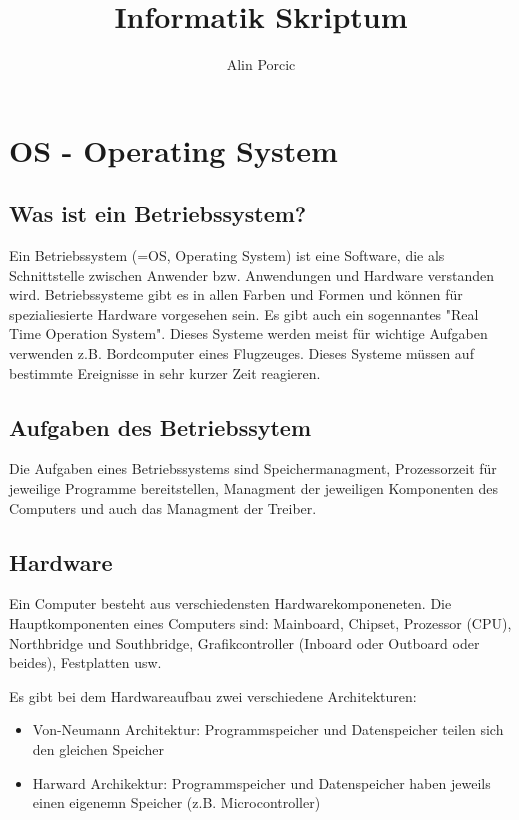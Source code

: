 \documentclass[a4paper]{report}
\title{Informatik Skriptum}
\author{Alin Porcic}
\begin{document}
\maketitle
\tableofcontents

\chapter{OS - Operating System}

\section{Was ist ein Betriebssystem?}

Ein Betriebssystem (=OS, Operating System) ist eine Software, die als Schnittstelle zwischen Anwender bzw. Anwendungen und Hardware verstanden wird.
Betriebssysteme gibt es in allen Farben und Formen und können für spezialiesierte Hardware vorgesehen sein. Es gibt auch ein sogennantes "Real Time
Operation System". Dieses Systeme werden meist für wichtige Aufgaben verwenden z.B. Bordcomputer eines Flugzeuges. Dieses Systeme müssen auf bestimmte
Ereignisse in sehr kurzer Zeit reagieren.


\section{Aufgaben des Betriebssytem}

Die Aufgaben eines Betriebssystems sind Speichermanagment,
Prozessorzeit für jeweilige Programme bereitstellen, Managment der jeweiligen Komponenten des 
Computers und auch das Managment der Treiber. 

\section{Hardware}

Ein Computer besteht aus verschiedensten Hardwarekomponeneten. Die Hauptkomponenten eines Computers sind: Mainboard, Chipset, Prozessor (CPU), Northbridge und Southbridge, Grafikcontroller (Inboard oder Outboard oder beides), Festplatten usw.

Es gibt bei dem Hardwareaufbau zwei verschiedene Architekturen:

	\begin{itemize}
	\item Von-Neumann Architektur: Programmspeicher und Datenspeicher teilen sich den gleichen Speicher
	\item Harward Archikektur: Programmspeicher und Datenspeicher haben jeweils einen eigenemn Speicher (z.B. Microcontroller)
	\end{itemize}
\end{document}
